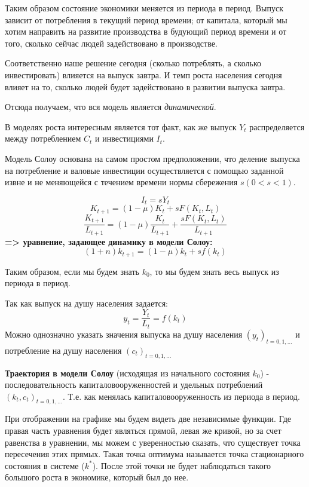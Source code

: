 \documentclass[reqno]{article}
\theoremstyle{definition}
\theoremstyle{definition}
\theoremstyle{definition}
\theoremstyle{definition}
\theoremstyle{definition}
\theoremstyle{definition}
\theoremstyle{definition}
\theoremstyle{definition}
\theoremstyle{definition}
\begin{document}
		Таким образом состояние экономики меняется из периода в период. Выпуск зависит от потребления в текущий период времени; от капитала, который мы хотим направить на развитие производства в будующий период времени и от того, сколько сейчас людей задействовано в производстве. 
		
		Соответственно наше решение сегодня (сколько потреблять, а сколько инвестировать) влияется на выпуск завтра. И темп роста населения сегодня влияет на то, сколько людей будет задействовано в развитии выпуска завтра. 
		
		Отсюда получаем, что вся модель является \emph{динамической}.\bigskip
		
		В моделях роста интересным является тот факт, как же выпуск $Y_t$ распределяется между потреблением $C_t$ и инвестициями $I_t$.
		
		Модель Солоу основана на самом простом предположении, что деление выпуска на потребление и валовые инвестиции осуществляется с помощью заданной извне и не меняющейся с течением времени нормы сбережения $s (0 < s < 1)$. 
		
		$$I_t = s Y_t$$
		$$K_{t+1} = (1 - \mu) K_t + s F(K_t, L_t)$$
		$$\frac{K_{t+1}}{L_{t+1}} = (1 - \mu) \frac{K_t}{L_{t+1}} + \frac{s F(K_t, L_t)}{L_{t+1}}$$
		\textbf{=> уравнение, задающее динамику в модели Солоу:}
		\begin{equation}\label{eq:1.3.4}
			(1 + n) k_{t + 1} = (1 - \mu) k_t + s f(k_t)
		\end{equation}
		
		Таким образом, если мы будем знать $k_0$, то мы будем знать весь выпуск из периода в период.
		
		Так как выпуск на душу населения задается:
		$$y_t = \frac{Y_t}{L_t} = f(k_t)$$
		Можно однозначно указать значения выпуска на душу населения $(y_t)_{t=0,1,\dots }$ и потребление на душу населения $(c_t)_{t=0,1,\dots}$ \bigskip
		
		\textbf{Траектория в модели Солоу} (исходящая из начального состояния $k_0$) - последовательность капиталовооруженностей и удельных потреблений $(k_t, c_t)_{t=0,1,\dots}$. Т.е. как менялась капиталовооруженность из периода в период.
		
		При отображении на графике мы будем видеть две независимые функции. Где правая часть уравнения будет являться прямой, левая же кривой, но за счет равенства в уравнении, мы можем с уверенностью сказать, что существует точка пересечения этих прямых. Такая точка оптимума называется точка стационарного состояния в системе ($k^*$). После этой точки не будет наблюдаться такого большого роста в экономике, который был до нее.
		
\end{document}
